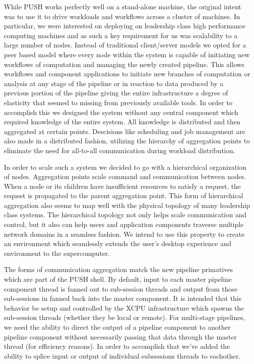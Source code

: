 While PUSH works perfectly well on a stand-alone machine, the original
intent was to use it to drive workloads and workflows across a cluster of
machines.  In particular, we were interested on deploying on leadership
class high performance computing machines and as such
a key requirement for us was scalability to a large number of nodes.  
Instead of traditional client/server models we opted for a peer based
model where every node within the system is capable of initiating new
workflows of computation and managing the newly created pipeline.
This allows workflows and component applications to initiate new branches
of computation or analysis at any stage of the pipeline or in reaction to
data produced by a previous portion of the pipeline giving the entire
infrastructure a degree of elasticity that seemed to missing from 
previously available tools.
In order to accomplish this we designed the system without any central
component which required knowledge of the entire system.
All knowledge is distributed and then aggregated at certain points.
Descisions like scheduling and job management are also made in a
distributed fashion, utilizing the hierarchy of aggregation points
to eliminate the need for all-to-all communication during workload
distribution.

In order to scale such a system we decided to go with a hierarchical
organization of nodes.  
Aggregation points scale command and communication between nodes.  
When a node or its children have insufficient resources to satisfy a request,
the request is propagated to the parent aggregation point.
This form of hierarchical aggregation also seems to map well with the 
physical topology of many leadership class systems.
The hierarchical topology not only helps scale communication and control,
but it also can help users and application components traverse multiple
network domains in a seamless fashion.
We intend to use this property to create an environment which seamlessly
extends the user's desktop experience and environment to the supercomputer.

The forms of communication aggregation match the new pipeline primatives 
which are part of the PUSH shell.
By default, input to each master pipeline component thread is fanned out 
to sub-session threads and output from those sub-sessions in fanned back
into the master component.
It is intended that this behavior be setup and controlled by the XCPU
infrastructure which spawns the sub-session threads (whether they be local
or remote).
For multi-stage pipelines, we need the ability to direct the output of
a pipeline component to another pipeline component without necessarily
passing that data through the master thread (for efficiency reasons).
In order to accomplish that we've added the ability to splice input or
output of individual subsessions threads to eachother.
